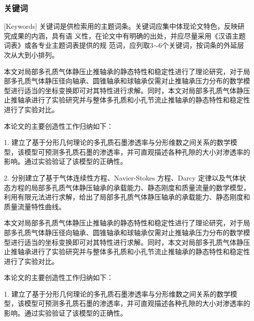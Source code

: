 



\subsubsection{关键词}[Keywords]
关键词是供检索用的主题词条。关键词应集中体现论文特色，反映研究成果的内涵，具有语
义性，在论文中有明确的出处，并应尽量采用《汉语主题词表》或各专业主题词表提供的规
范词，应列取3$\sim$6个关键词，按词条的外延层次从大到小排列。



本文对局部多孔质气体静压止推轴承的静态特性和稳定性进行了理论研究，对于局部多孔质气体静压径向轴承、圆锥轴承和球轴承仅需对止推轴承压力分布的数学模型进行适当的坐标变换即可对其特性进行求解。同时，本文对局部多孔质气体静压止推轴承进行了实验研究并与整体多孔质和小孔节流止推轴承的静态特性和稳定性进行了实验对比。 

本论文的主要创造性工作归纳如下：

1. 建立了基于分形几何理论的多孔质石墨渗透率与分形维数之间关系的数学模型，该模型可预测多孔质石墨的渗透率，并可直观描述各种孔隙的大小对渗透率的影响。通过实验验证了该模型的正确性。

2. 分别建立了基于气体连续性方程、Navier-Stokes 方程、Darcy 定律以及气体状态方程的局部多孔质气体静压轴承的承载能力、静态刚度和质量流量的数学模型，利用有限元法进行求解，给出了局部多孔质气体静压轴承的承载能力、静态刚度和质量流量特性曲线。

本文对局部多孔质气体静压止推轴承的静态特性和稳定性进行了理论研究，对于局部多孔质气体静压径向轴承、圆锥轴承和球轴承仅需对止推轴承压力分布的数学模型进行适当的坐标变换即可对其特性进行求解。同时，本文对局部多孔质气体静压止推轴承进行了实验研究并与整体多孔质和小孔节流止推轴承的静态特性和稳定性进行了实验对比。 

本论文的主要创造性工作归纳如下：

1. 建立了基于分形几何理论的多孔质石墨渗透率与分形维数之间关系的数学模型，该模型可预测多孔质石墨的渗透率，并可直观描述各种孔隙的大小对渗透率的影响。通过实验验证了该模型的正确性。

